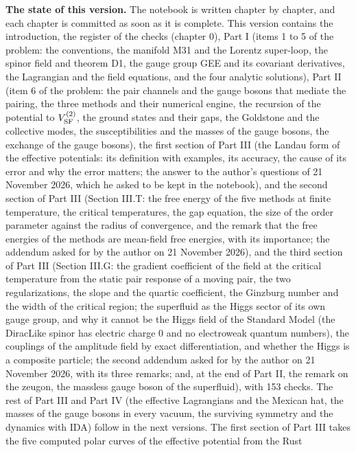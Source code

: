\documentclass[
  10pt,
]{article}
\begin{document}
\textbf{The state of this version.} The notebook is written chapter by
chapter, and each chapter is committed as soon as it is complete. This
version contains the introduction, the register of the checks (chapter
0), Part I (items 1 to 5 of the problem: the conventions, the manifold
M31 and the Lorentz super-loop, the spinor field and theorem D1, the
gauge group GEE and its covariant derivatives, the Lagrangian and the
field equations, and the four analytic solutions), Part II (item 6 of
the problem: the pair channels and the gauge bosons that mediate the
pairing, the three methods and their numerical engine, the recursion of
the potential to \(V^{(2)}_{\rm SF}\), the ground states and their gaps,
the Goldstone and the collective modes, the susceptibilities and the
masses of the gauge bosons, the exchange of the gauge bosons), the first
section of Part III (the Landau form of the effective potentials: its
definition with examples, its accuracy, the cause of its error and why
the error matters; the answer to the author's questions of 21 November
2026, which he asked to be kept in the notebook), and the second section
of Part III (Section III.T: the free energy of the five methods at
finite temperature, the critical temperatures, the gap equation, the
size of the order parameter against the radius of convergence, and the
remark that the free energies of the methods are mean-field free
energies, with its importance; the addendum asked for by the author on
21 November 2026), and the third section of Part III (Section III.G: the
gradient coefficient of the field at the critical temperature from the
static pair response of a moving pair, the two regularizations, the
slope and the quartic coefficient, the Ginzburg number and the width of
the critical region; the superfluid as the Higgs sector of its own gauge
group, and why it cannot be the Higgs field of the Standard Model (the
DiracLike spinor has electric charge 0 and no electroweak quantum
numbers), the couplings of the amplitude field by exact differentiation,
and whether the Higgs is a composite particle; the second addendum asked
for by the author on 21 November 2026, with its three remarks; and, at
the end of Part II, the remark on the zeugon, the massless gauge boson
of the superfluid), with 153 checks. The rest of Part III and Part IV
(the effective Lagrangians and the Mexican hat, the masses of the gauge
bosons in every vacuum, the surviving symmetry and the dynamics with
IDA) follow in the next versions. The first section of Part III takes
the five computed polar curves of the effective potential from the Rust
\end{document}
